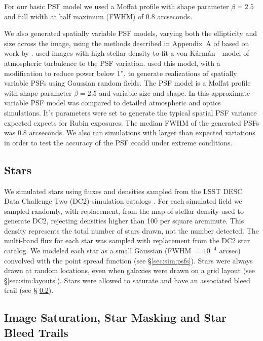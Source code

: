 \documentclass[twocolumn,twocolappendix,astrosym]{openjournal}
\newcommand{\vonkarman}{{von K\'arm\'an}~}
\begin{document}
For our basic PSF model we used a Moffat profile \citep{Moffat1969} with
shape parameter $\beta=2.5$ and full width at half maximum (FWHM) of 0.8 arcseconds.

We also generated spatially variable PSF models, varying both the
ellipticity and size across the image, using the methods described in
Appendix~A of \citet{mdet20} based on work by \citet{heymans2012}.
\citet{heymans2012} used images with high stellar density to fit a \vonkarman\
model of atmospheric turbulence to the PSF variation. \citet{mdet20}
used this model, with a modification to reduce power below 1'', to generate
realizations of spatially variable PSFs using Gaussian random fields. The PSF
model is a Moffat \citep{Moffat1969} profile with shape parameter $\beta=2.5$
and variable size and shape. In \citet{mdet20} this approximate
variable PSF model was compared to detailed atmospheric and optics simulations.
It's parameters were set to generate the typical spatial PSF variance expected
expects for Rubin exposures. The median FWHM of the generated PSFs was 0.8
arcseconds.  We also ran simulations with larger than expected variations in
order to test the accuracy of the PSF coadd under extreme conditions.

\subsection{Stars} \label{sec:sim:stars}

We simulated stars using fluxes and densities sampled from the LSST DESC Data
Challenge Two (DC2) simulation catalogs \citep{DC2Abolfathi2021}.  For each
simulated field we sampled randomly, with replacement, from the map of stellar
density used to generate DC2, rejecting densities higher than 100 per square
arcminute.  This density represents the total number of stars drawn, not the
number detected.  The multi-band flux for each star was sampled with
replacement from the DC2 star catalog.  We modeled each star as a small
Gaussian (FWHM $= 10^{-4}$ arcsec) convolved with the point spread function
(see \S \ref{sec:sim:psfs}).  Stars were always drawn at random locations, even
when galaxies were drawn on a grid layout (see \S \ref{sec:sim:layouts}).
Stars were allowed to saturate and have an associated bleed trail (see \S
\ref{sec:sim:satbleeds}).

\subsection{Image Saturation, Star Masking and Star Bleed Trails} \label{sec:sim:satbleeds}
\end{document}
